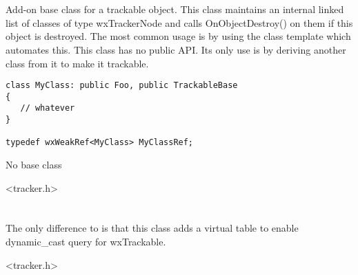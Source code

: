 
\section{}\label{wxtrackablebase}

Add-on base class for a trackable object. This class maintains
an internal linked list of classes of type wxTrackerNode and
calls OnObjectDestroy() on them if this object is destroyed.
The most common usage is by using the 
class template which automates this. This class has no public
API. Its only use is by deriving another class from it to
make it trackable.

\begin{verbatim}
class MyClass: public Foo, public TrackableBase
{
   // whatever
}

typedef wxWeakRef<MyClass> MyClassRef;
\end{verbatim}


No base class


<tracker.h>



\section{}\label{wxtrackable}

The only difference to  is
that this class adds a virtual table to enable dynamic\_cast query for
wxTrackable.




<tracker.h>



